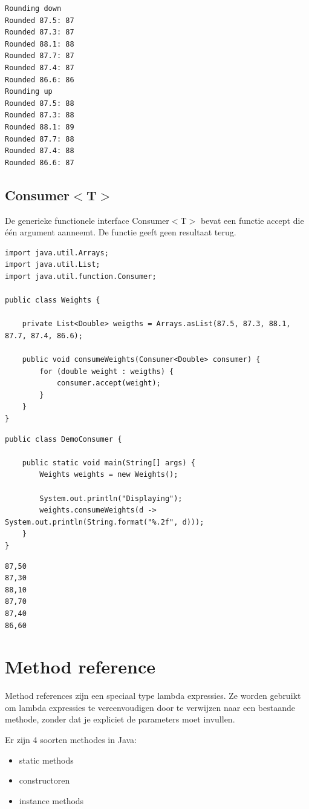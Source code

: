 \documentclass{tstextbook}
\begin{document}
\begin{verbatim}
Rounding down
Rounded 87.5: 87
Rounded 87.3: 87
Rounded 88.1: 88
Rounded 87.7: 87
Rounded 87.4: 87
Rounded 86.6: 86
Rounding up
Rounded 87.5: 88
Rounded 87.3: 88
Rounded 88.1: 89
Rounded 87.7: 88
Rounded 87.4: 88
Rounded 86.6: 87
\end{verbatim}

\subsection{Consumer$<$T$>$}

De generieke functionele interface Consumer$<$T$>$ bevat een functie accept die \'e\'en argument aanneemt. De functie geeft geen resultaat terug. 

\begin{lstlisting}
import java.util.Arrays;
import java.util.List;
import java.util.function.Consumer;

public class Weights {

	private List<Double> weigths = Arrays.asList(87.5, 87.3, 88.1, 87.7, 87.4, 86.6);

	public void consumeWeights(Consumer<Double> consumer) {
		for (double weight : weigths) {
			consumer.accept(weight);
		}
	}
}
\end{lstlisting}

\begin{lstlisting}
public class DemoConsumer {

	public static void main(String[] args) {
		Weights weights = new Weights();

		System.out.println("Displaying");
		weights.consumeWeights(d -> System.out.println(String.format("%.2f", d)));
	}
}
\end{lstlisting}

\begin{verbatim}
87,50
87,30
88,10
87,70
87,40
86,60
\end{verbatim}

\section{Method reference}

Method references zijn een speciaal type lambda expressies. Ze worden gebruikt om lambda expressies te vereenvoudigen door te verwijzen naar een bestaande methode, zonder dat je expliciet de parameters moet invullen.

Er zijn 4 soorten methodes in Java:
\begin{itemize}
\item static methods
\item constructoren
\item instance methods
\end{itemize}
\end{document}
